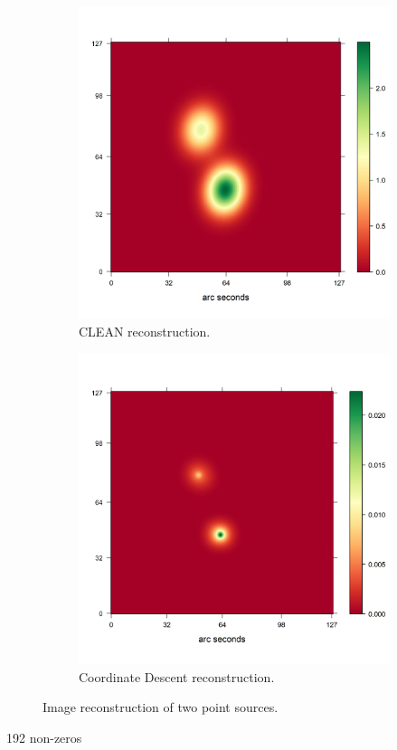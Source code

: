 \begin{figure}[h]
	\centering
	\begin{subfigure}[b]{0.4\linewidth}
		\includegraphics[width=\linewidth]{./chapters/20.results/points/tclean_points.png}
		\caption{CLEAN reconstruction.}
		\label{results:points:tclean}
	\end{subfigure}
	\begin{subfigure}[b]{0.4\linewidth}
		\includegraphics[width=\linewidth]{./chapters/20.results/points/cd_points.png}
		\caption{Coordinate Descent reconstruction.}
		\label{results:points:cd}
	\end{subfigure}
	
	\caption{Image reconstruction of two point sources.}
	\label{results:point}
\end{figure}
192 non-zeros

